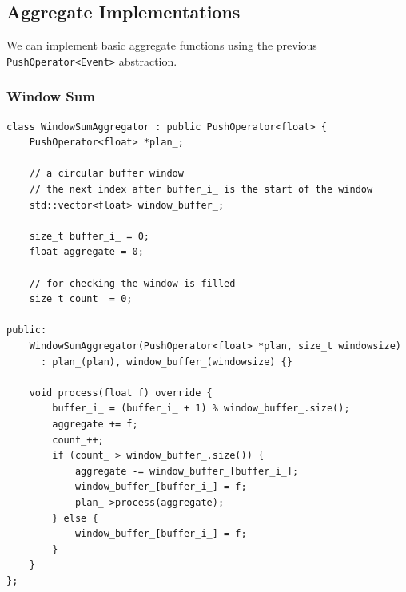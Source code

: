 \subsection{Aggregate Implementations}
We can implement basic aggregate functions using the previous \texttt{PushOperator<Event>} abstraction.
\subsubsection{Window Sum}
\begin{verbatim}
class WindowSumAggregator : public PushOperator<float> {
    PushOperator<float> *plan_;

    // a circular buffer window
    // the next index after buffer_i_ is the start of the window
    std::vector<float> window_buffer_;

    size_t buffer_i_ = 0;
    float aggregate = 0;

    // for checking the window is filled
    size_t count_ = 0;

public:
    WindowSumAggregator(PushOperator<float> *plan, size_t windowsize) 
      : plan_(plan), window_buffer_(windowsize) {}

    void process(float f) override {
        buffer_i_ = (buffer_i_ + 1) % window_buffer_.size();
        aggregate += f;
        count_++;
        if (count_ > window_buffer_.size()) {
            aggregate -= window_buffer_[buffer_i_];
            window_buffer_[buffer_i_] = f;
            plan_->process(aggregate);
        } else {
            window_buffer_[buffer_i_] = f;
        }
    }
};
\end{verbatim}

